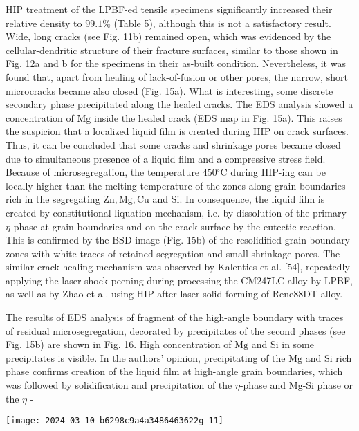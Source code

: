 \documentclass[10pt]{article}
\begin{document}
HIP treatment of the LPBF-ed tensile specimens significantly increased their relative density to $99.1 \%$ (Table 5), although this is not a satisfactory result. Wide, long cracks (see Fig. 11b) remained open, which was evidenced by the cellular-dendritic structure of their fracture surfaces, similar to those shown in Fig. 12a and b for the specimens in their as-built condition. Nevertheless, it was found that, apart from healing of lack-of-fusion or other pores, the narrow, short microcracks became also closed (Fig. 15a). What is interesting, some discrete secondary phase precipitated along the healed cracks. The EDS analysis showed a concentration of $\mathrm{Mg}$ inside the healed crack (EDS map in Fig. 15a). This raises the suspicion that a localized liquid film is created during HIP on crack surfaces. Thus, it can be concluded that some cracks and shrinkage pores became closed due to simultaneous presence of a liquid film and a compressive stress field. Because of microsegregation, the temperature $450{ }^{\circ} \mathrm{C}$ during HIP-ing can be locally higher than the melting temperature of the zones along grain boundaries rich in the segregating $\mathrm{Zn}, \mathrm{Mg}, \mathrm{Cu}$ and $\mathrm{Si}$. In consequence, the liquid film is created by constitutional liquation mechanism, i.e. by dissolution of the primary $\eta$-phase at grain boundaries and on the crack surface by the eutectic reaction. This is confirmed by the BSD image (Fig. 15b) of the resolidified grain boundary zones with white traces of retained segregation and small shrinkage pores. The similar crack healing mechanism was observed by Kalentics et al. [54], repeatedly applying the laser shock peening during processing the CM247LC alloy by LPBF, as well as by Zhao et al. using HIP after laser solid forming of Rene88DT alloy.

The results of EDS analysis of fragment of the high-angle boundary with traces of residual microsegregation, decorated by precipitates of the second phases (see Fig. 15b) are shown in Fig. 16. High concentration of $\mathrm{Mg}$ and $\mathrm{Si}$ in some precipitates is visible. In the authors' opinion, precipitating of the $\mathrm{Mg}$ and $\mathrm{Si}$ rich phase confirms creation of the liquid film at high-angle grain boundaries, which was followed by solidification and precipitation of the $\eta$-phase and $\mathrm{Mg}$-Si phase or the $\eta$ -

\begin{center}
\texttt{[image: 2024\_03\_10\_b6298c9a4a3486463622g-11]}
\end{center}
\end{document}
